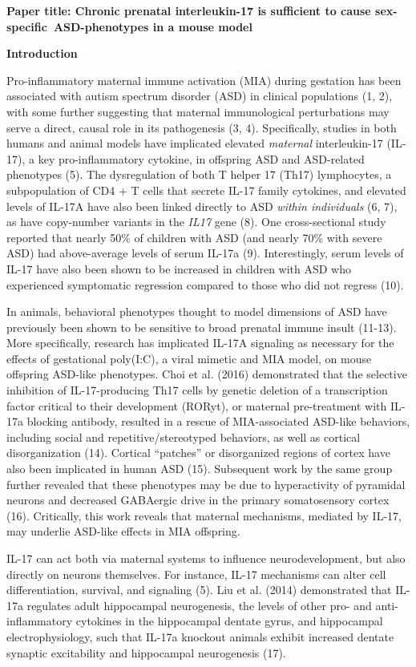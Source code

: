 \documentclass[]{article}
\date{}
\begin{document}
\textbf{Paper title: Chronic prenatal interleukin-17 is sufficient to
cause sex-specific~ASD-phenotypes in a mouse model}

\textbf{Introduction}

Pro-inflammatory maternal immune activation (MIA) during gestation has
been associated with autism spectrum disorder (ASD) in clinical
populations (1, 2), with some further suggesting that maternal
immunological perturbations may serve a direct, causal role in its
pathogenesis (3, 4). Specifically, studies in both humans and animal
models have implicated elevated \emph{maternal} interleukin-17 (IL-17),
a key pro-inflammatory cytokine, in offspring ASD and ASD-related
phenotypes (5). The dysregulation of both T helper 17 (Th17)
lymphocytes, a subpopulation of CD4 + T cells that secrete IL-17 family
cytokines, and elevated levels of IL-17A have also been linked directly
to ASD \emph{within individuals} (6, 7), as have copy-number variants in
the \emph{IL17} gene (8). One cross-sectional study reported that nearly
50\% of children with ASD (and nearly 70\% with severe ASD) had
above-average levels of serum IL-17a (9). Interestingly, serum levels of
IL-17 have also been shown to be increased in children with ASD who
experienced symptomatic regression compared to those who did not regress
(10).

In animals, behavioral phenotypes thought to model dimensions of ASD
have previously been shown to be sensitive to broad prenatal immune
insult (11-13). More specifically, research has implicated IL-17A
signaling as necessary for the effects of gestational poly(I:C), a viral
mimetic and MIA model, on mouse offspring ASD-like phenotypes. Choi et
al. (2016) demonstrated that the selective inhibition of IL-17-producing
Th17 cells by genetic deletion of a transcription factor critical to
their development (RORyt), or maternal pre-treatment with IL-17a
blocking antibody, resulted in a rescue of MIA-associated ASD-like
behaviors, including social and repetitive/stereotyped behaviors, as
well as cortical disorganization (14). Cortical ``patches'' or
disorganized regions of cortex have also been implicated in human ASD
(15). Subsequent work by the same group further revealed that these
phenotypes may be due to hyperactivity of pyramidal neurons and
decreased GABAergic drive in the primary somatosensory cortex (16).
Critically, this work reveals that maternal mechanisms, mediated by
IL-17, may underlie ASD-like effects in MIA offspring.

IL-17 can act both via maternal systems to influence neurodevelopment,
but also directly on neurons themselves. For instance, IL-17 mechanisms
can alter cell differentiation, survival, and signaling (5). Liu et al.
(2014) demonstrated that IL-17a regulates adult hippocampal
neurogenesis, the levels of other pro- and anti-inflammatory cytokines
in the hippocampal dentate gyrus, and hippocampal electrophysiology,
such that IL-17a knockout animals exhibit increased dentate synaptic
excitability and hippocampal neurogenesis (17).
\end{document}
